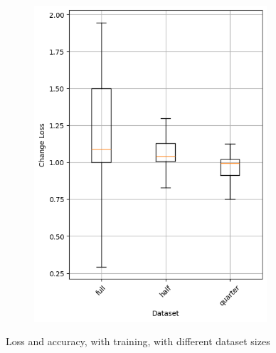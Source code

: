 \begin{figure}
\begin{subfigure}{0.5\textwidth}
        \includegraphics[width=0.95\textwidth]{plots/Dataset_Trained_loss.png}
    \end{subfigure}
    \caption{Loss and accuracy, with training, with different dataset sizes}
    \label{fig:dataset-size-training}
\end{figure}
